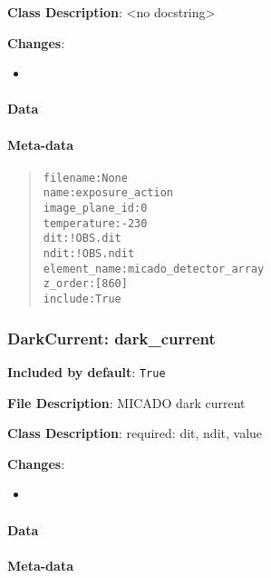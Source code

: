 \documentclass[a4paper]{article}
\begin{document}
\textbf{Class Description}: <no docstring>

\textbf{Changes}:

\begin{itemize}
\item \end{itemize}


\paragraph{Data%
  \label{id29}%
}


\paragraph{Meta-data%
  \label{id30}%
}

\begin{quote}
\begin{alltt}
      filename : None
          name : exposure_action
image_plane_id : 0
   temperature : -230
           dit : !OBS.dit
          ndit : !OBS.ndit
  element_name : micado_detector_array
       z_order : [860]
       include : True
\end{alltt}
\end{quote}


\subsubsection{DarkCurrent: \textquotedbl{}dark\_current\textquotedbl{}%
  \label{darkcurrent-dark-current}%
}

\textbf{Included by default}: \texttt{True}

\textbf{File Description}: MICADO dark current

\textbf{Class Description}: required: dit, ndit, value

\textbf{Changes}:

\begin{itemize}
\item \end{itemize}


\paragraph{Data%
  \label{id31}%
}


\paragraph{Meta-data%
  \label{id32}%
}
\end{document}

